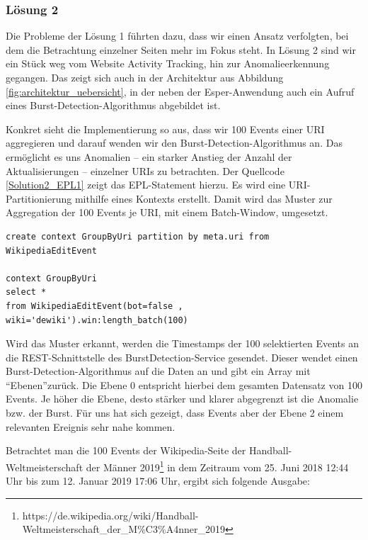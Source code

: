 \subsubsection{Lösung 2}
Die Probleme der Lösung 1 führten dazu, dass wir einen Ansatz verfolgten, bei dem die Betrachtung einzelner Seiten mehr im Fokus steht.
In Lösung 2 sind wir ein Stück weg vom Website Activity Tracking, hin zur Anomalieerkennung gegangen. Das zeigt sich auch in der
Architektur aus Abbildung \ref{fig:architektur_uebersicht}, in der neben der Esper-Anwendung auch ein Aufruf eines
Burst-Detection-Algorithmus abgebildet ist.

Konkret sieht die Implementierung so aus, dass wir 100 Events einer URI aggregieren und darauf wenden wir den Burst-Detection-Algorithmus an.
Das ermöglicht es uns Anomalien -- ein starker Anstieg der Anzahl der Aktualisierungen -- einzelner URIs zu betrachten.
Der Quellcode \ref{Solution2_EPL1} zeigt das EPL-Statement hierzu. Es wird eine URI-Partitionierung mithilfe eines
Kontexts erstellt. Damit wird das Muster zur Aggregation der 100 Events je URI, mit einem Batch-Window, umgesetzt.

\begin{lstlisting}[label=Solution2_EPL1,caption=Lösung 2: EPL-Statement 2,language=epl,firstnumber=1,captionpos=b]
create context GroupByUri partition by meta.uri from WikipediaEditEvent

context GroupByUri
select *
from WikipediaEditEvent(bot=false , wiki='dewiki').win:length_batch(100)
\end{lstlisting}

Wird das Muster erkannt, werden die Timestamps der 100 selektierten Events an die REST-Schnittstelle des BurstDetection-Service gesendet.
Dieser wendet einen Burst-Detection-Algorithmus auf die Daten an und gibt ein Array mit \textquotedblleft Ebenen\textquotedblright zurück.
Die Ebene 0 entspricht hierbei dem gesamten Datensatz von 100 Events. Je höher die Ebene, desto stärker und klarer abgegrenzt ist die
Anomalie bzw. der Burst. Für uns hat sich gezeigt, dass Events aber der Ebene 2 einem relevanten Ereignis sehr nahe kommen.

Betrachtet man die 100 Events der Wikipedia-Seite der Handball-Weltmeisterschaft der Männer 2019\footnote{https://de.wikipedia.org/wiki/Handball-Weltmeisterschaft\newline{}\_der\_M\%C3\%A4nner\_2019}
in dem Zeitraum vom 25. Juni 2018 12:44 Uhr bis zum 12. Januar 2019 17:06 Uhr, ergibt sich folgende Ausgabe:

